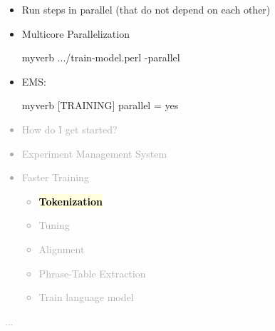 \documentclass[landscape]{uedslides2C}
\newcommand{\currenttopic}[1]{\colorbox{lightyellow}{\textcolor{black}{\bf #1}}}
\begin{document}


\begin{itemize} \itemsep 10mm
\vspace{10mm}
\item Run steps in parallel (that do not depend on each other)

\item {Multicore Parallelization}\\[4mm]
\begin{SaveVerbatim}{myverb} 
  .../train-model.perl -parallel
\end{SaveVerbatim}
\colorbox{gray}{}

\item EMS: \\[4mm]
\begin{SaveVerbatim}{myverb} 
  [TRAINING]
  parallel = yes
\end{SaveVerbatim}
\colorbox{gray}{}


\end{itemize}


\vspace{-5mm}
\textcolor{darkgrey}{
\begin{itemize} \itemsep -1mm
\item {How do I get started?}
\item {Experiment Management System}
\item {Faster Training}
  \begin{itemize}
  \item \currenttopic{Tokenization}
  \item Tuning
  \item Alignment
  \item Phrase-Table Extraction
  \item Train language model
  \end{itemize}
\end{itemize}
...
}


\end{document}
